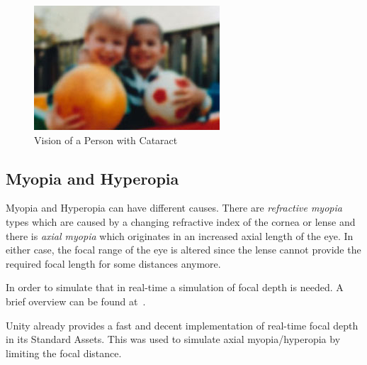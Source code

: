 \documentclass{acm_proc_article-sp}
\begin{document}
\begin{figure}
    \centering
    \includegraphics[width=\columnwidth]{cataractvision.png}
    \caption{Vision of a Person with Cataract}
    \label{fig:cataract}
\end{figure}

\subsection{Myopia and Hyperopia}

Myopia and Hyperopia can have different causes. There are \emph{refractive myopia} types which are caused by a changing refractive index of the cornea or lense and there is \emph{axial myopia} which originates in an increased axial length of the eye.
In either case, the focal range of the eye is altered since the lense cannot provide the required focal length for some distances anymore.

In order to simulate that in real-time a simulation of focal depth is needed.
A brief overview can be found at~\cite{gpugems-DoF}.

Unity already provides a fast and decent implementation of real-time focal depth in its Standard Assets.
This was used to simulate axial myopia/hyperopia by limiting the focal distance.
\end{document}
